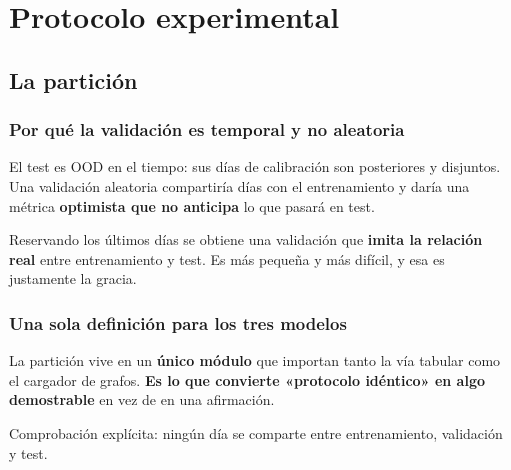 \chapter{Protocolo experimental}
\label{cap:protocolo}


\section{La partición}
\label{sec:particion}
\subsection{Por qué la validación es temporal y no aleatoria}
El test es OOD en el tiempo: sus días de calibración son posteriores y disjuntos. Una
validación aleatoria compartiría días con el entrenamiento y daría una métrica
\textbf{optimista que no anticipa} lo que pasará en test.

Reservando los últimos días se obtiene una validación que \textbf{imita la relación real}
entre entrenamiento y test. Es más pequeña y más difícil, y esa es justamente la gracia.

\subsection{Una sola definición para los tres modelos}
La partición vive en un \textbf{único módulo} que importan tanto la vía tabular como el
cargador de grafos. \textbf{Es lo que convierte «protocolo idéntico» en algo demostrable} en
vez de en una afirmación.

Comprobación explícita: ningún día se comparte entre entrenamiento, validación y test.

